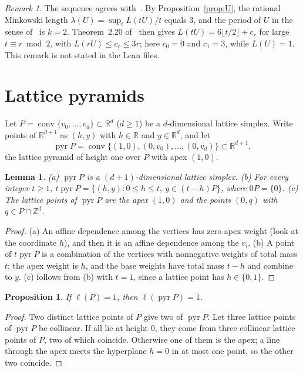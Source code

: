 \documentclass[11pt]{article}
\newtheorem{lemma}{Lemma}
\newtheorem{proposition}{Proposition}
\theoremstyle{definition}
\theoremstyle{remark}
\newtheorem{remark}{Remark}
\newcommand{\Z}{\mathbb Z}
\newcommand{\R}{\mathbb R}
\DeclareMathOperator{\conv}{conv}
\DeclareMathOperator{\pyr}{pyr}
\begin{document}
\begin{remark}\label{rem:period}
The sequence agrees with~\cite[Theorem~2.20]{ss}. By
Proposition~\ref{prop:U}, the rational Minkowski length
$\lambda(U)=\sup_tL(tU)/t$ \cite[Definition~2.7]{ss} equals $3$, and the
period of $U$ in the sense of~\cite[Definition~2.17]{ss} is $k=2$. Theorem~2.20
of~\cite{ss} then gives $L(tU)=6\lfloor t/2\rfloor+c_r$ for large
$t\equiv r\bmod2$, with $L(rU)\le c_r\le 3r$; here $c_0=0$ and $c_1=3$, while
$L(U)=1$. This remark is not stated in the Lean files.
\end{remark}

\section{Lattice pyramids}\label{sec:pyr}

Let $P=\conv\{v_0,\dots,v_d\}\subset\R^d$ ($d\ge1$) be a $d$-dimensional
lattice simplex. Write points of $\R^{d+1}$ as $(h,y)$ with $h\in\R$ and
$y\in\R^d$, and let
\[
\pyr P=\conv\{(1,0),(0,v_0),\dots,(0,v_d)\}\subset\R^{d+1},
\]
the lattice pyramid of height one over $P$ with apex $(1,0)$.

\begin{lemma}\label{lem:pyr}
(a) $\pyr P$ is a $(d+1)$-dimensional lattice simplex.
(b) For every integer $t\ge1$,
$t\pyr P=\{(h,y): 0\le h\le t,\ y\in(t-h)P\}$, where $0P=\{0\}$.
(c) The lattice points of $\pyr P$ are the apex $(1,0)$ and the points $(0,q)$
with $q\in P\cap\Z^d$.
\end{lemma}

\begin{proof}
(a) An affine dependence among the vertices has zero apex weight (look at the
coordinate $h$), and then it is an affine dependence among the $v_i$. (b) A
point of $t\pyr P$ is a combination of the vertices with nonnegative weights
of total mass $t$; the apex weight is $h$, and the base weights have total
mass $t-h$ and combine to $y$. (c) follows from (b) with $t=1$, since a
lattice point has $h\in\{0,1\}$.
\end{proof}

\begin{proposition}\label{prop:pyrdiam}
If $\ell(P)=1$, then $\ell(\pyr P)=1$.
\end{proposition}

\begin{proof}
Two distinct lattice points of $P$ give two of $\pyr P$. Let three lattice
points of $\pyr P$ be collinear. If all lie at height $0$, they come from three
collinear lattice points of $P$, two of which coincide. Otherwise one of them
is the apex; a line through the apex meets the hyperplane $h=0$ in at most one
point, so the other two coincide.
\end{proof}
\end{document}
